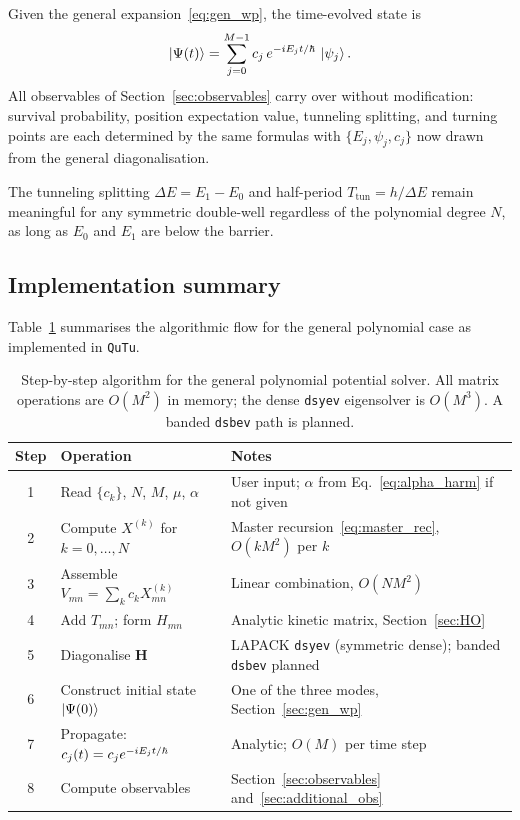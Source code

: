 Given the general expansion~\eqref{eq:gen_wp}, the time-evolved state is
\begin{equation}\label{eq:gen_psi_t}
  \ket{\Psi(t)} = \sum_{j=0}^{M-1} c_j\,e^{-iE_j t/\hbar}\,\ket{\psi_j}.
\end{equation}
All observables of Section~\ref{sec:observables} carry over without
modification: survival probability, position expectation value, tunneling
splitting, and turning points are each determined by the same formulas with
$\{E_j,\psi_j,c_j\}$ now drawn from the general diagonalisation.

\begin{remark}
  The tunneling splitting $\Delta E=E_1-E_0$ and half-period
  $T_{\mathrm{tun}}=h/\Delta E$ remain meaningful for any symmetric double-well
  regardless of the polynomial degree $N$, as long as $E_0$ and $E_1$ are
  below the barrier.
\end{remark}

\subsection{Implementation summary}\label{sec:gen_impl}

Table~\ref{tab:gen_impl} summarises the algorithmic flow for the general
polynomial case as implemented in \texttt{QuTu}.

\begin{table}[htbp]
  \centering
  \caption{%
    Step-by-step algorithm for the general polynomial potential solver.
    All matrix operations are $O(M^2)$ in memory; the dense \texttt{dsyev}
    eigensolver is $O(M^3)$.  A banded \texttt{dsbev} path is planned.%
  }
  \label{tab:gen_impl}
  \begin{tabular}{clp{7cm}}
    \toprule
    Step & Operation & Notes \\
    \midrule
    1 & Read $\{c_k\}$, $N$, $M$, $\mu$, $\alpha$ &
        User input; $\alpha$ from Eq.~\eqref{eq:alpha_harm} if not given \\
    2 & Compute $X^{(k)}$ for $k=0,\ldots,N$ &
        Master recursion~\eqref{eq:master_rec}, $O(kM^2)$ per $k$ \\
    3 & Assemble $V_{mn} = \sum_k c_k X^{(k)}_{mn}$ &
        Linear combination, $O(NM^2)$ \\
    4 & Add $T_{mn}$; form $H_{mn}$ &
        Analytic kinetic matrix, Section~\ref{sec:HO} \\
    5 & Diagonalise $\mathbf{H}$ &
        LAPACK \texttt{dsyev} (symmetric dense); banded \texttt{dsbev} planned \\
    6 & Construct initial state $\ket{\Psi(0)}$ &
        One of the three modes, Section~\ref{sec:gen_wp} \\
    7 & Propagate: $c_j(t)=c_j e^{-iE_j t/\hbar}$ &
        Analytic; $O(M)$ per time step \\
    8 & Compute observables &
        Section~\ref{sec:observables} and~\ref{sec:additional_obs} \\
    \bottomrule
  \end{tabular}
\end{table}
